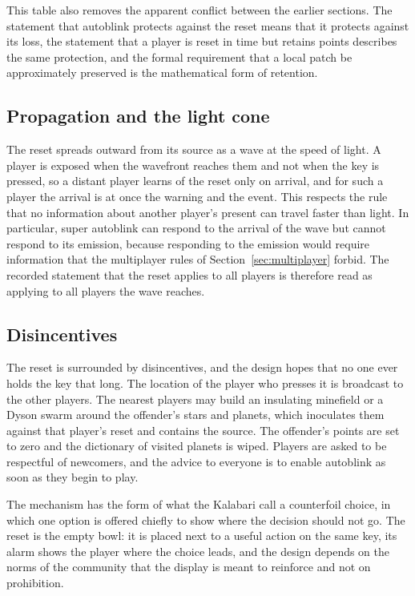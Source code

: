 \documentclass[11pt]{article}
\begin{document}
This table also removes the apparent conflict between the earlier sections. The statement that autoblink protects against the reset means that it protects against its loss, the statement that a player is reset in time but retains points describes the same protection, and the formal requirement that a local patch be approximately preserved is the mathematical form of retention.

\subsection{Propagation and the light cone}

The reset spreads outward from its source as a wave at the speed of light. A player is exposed when the wavefront reaches them and not when the key is pressed, so a distant player learns of the reset only on arrival, and for such a player the arrival is at once the warning and the event. This respects the rule that no information about another player's present can travel faster than light. In particular, super autoblink can respond to the arrival of the wave but cannot respond to its emission, because responding to the emission would require information that the multiplayer rules of Section~\ref{sec:multiplayer} forbid. The recorded statement that the reset applies to all players is therefore read as applying to all players the wave reaches.

\subsection{Disincentives}

The reset is surrounded by disincentives, and the design hopes that no one ever holds the key that long. The location of the player who presses it is broadcast to the other players. The nearest players may build an insulating minefield or a Dyson swarm around the offender's stars and planets, which inoculates them against that player's reset and contains the source. The offender's points are set to zero and the dictionary of visited planets is wiped. Players are asked to be respectful of newcomers, and the advice to everyone is to enable autoblink as soon as they begin to play.

The mechanism has the form of what the Kalabari call a counterfoil choice, in which one option is offered chiefly to show where the decision should not go. The reset is the empty bowl: it is placed next to a useful action on the same key, its alarm shows the player where the choice leads, and the design depends on the norms of the community that the display is meant to reinforce and not on prohibition.
\end{document}
